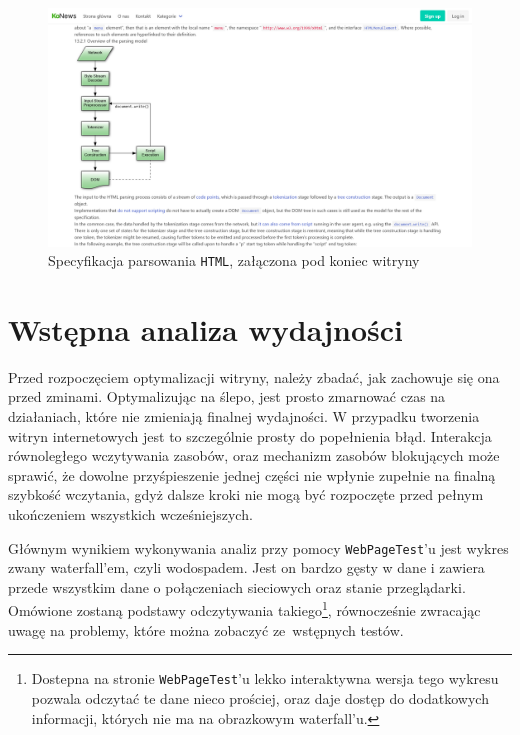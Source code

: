 \documentclass[licencjacka]{pracadypl}
\begin{document}
\begin{figure}[H]
  \includegraphics[width=\linewidth]{images/frontpage-spec.png}
  \caption{Specyfikacja parsowania \texttt{HTML}, załączona pod koniec witryny}
  \label{fig:frontpage-spec}
\end{figure}




\section{Wstępna analiza wydajności}
Przed rozpoczęciem optymalizacji witryny, należy zbadać, jak zachowuje się ona przed zminami. Optymalizując na ślepo, jest prosto zmarnować czas na działaniach, które nie zmieniają finalnej wydajności. W przypadku tworzenia witryn internetowych jest to szczególnie prosty do popełnienia błąd. Interakcja równoległego wczytywania zasobów, oraz mechanizm zasobów blokujących może sprawić, że dowolne przyśpieszenie jednej części nie wpłynie zupełnie na finalną szybkość wczytania, gdyż dalsze kroki nie mogą być rozpoczęte przed pełnym ukończeniem wszystkich wcześniejszych.

Głównym wynikiem wykonywania analiz przy pomocy \texttt{WebPageTest}'u jest wykres zwany waterfall'em, czyli wodospadem. Jest on bardzo gęsty w dane i zawiera przede wszystkim dane o połączeniach sieciowych oraz stanie przeglądarki. Omówione zostaną podstawy odczytywania takiego\footnote{Dostepna na stronie \texttt{WebPageTest}'u lekko interaktywna wersja tego wykresu pozwala odczytać te dane nieco prościej, oraz daje dostęp do dodatkowych informacji, których nie ma na obrazkowym waterfall'u.}, równocześnie zwracając uwagę na problemy, które można zobaczyć ze~wstępnych testów.
\end{document}
